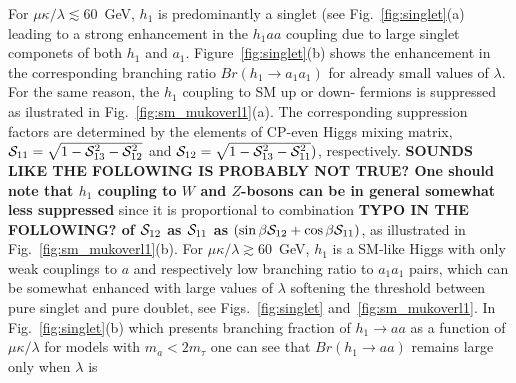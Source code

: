 \documentclass[aps,prl,twocolumn,nofootinbib,superscriptaddress]{revtex4}
\def\SC{{\cal S}}
\begin{document}
For $\mu\kappa/\lambda \lesssim 60$~GeV, $h_1$ is predominantly a singlet 
(see Fig.~\ref{fig:singlet}(a) leading to a strong enhancement in the $h_1 aa$ coupling due 
to large singlet componets of both $h_1$ and $a_1$. Figure~\ref{fig:singlet}(b) shows the
enhancement in the corresponding branching ratio $Br(h_1\to a_1 a_1)$ for already 
small values of $\lambda$. For the same reason, the $h_1$ coupling to SM up or down- fermions 
is suppressed as ilustrated in Fig.~\ref{fig:sm_mukoverl1}(a). The corresponding suppression 
factors are determined by the elements of CP-even Higgs mixing matrix, 
$\SC_{11} = \sqrt{1-\SC_{13}^2-\SC_{12}^2}$ and $\SC_{12} = \sqrt{1-\SC_{13}^2-\SC_{11}^2})$, 
respectively. {\bf SOUNDS LIKE THE FOLLOWING IS PROBABLY NOT TRUE? One should note that $h_1$ coupling to 
$W$ and $Z$-bosons can be in general somewhat less suppressed} since it is proportional to combination 
{\bf TYPO IN THE FOLLOWING? of $\SC_{12}$ as $\SC_{11}$ as $(\sin\beta \SC_{12}+\cos\beta \SC_{11})$}, as 
illustrated in Fig.~\ref{fig:sm_mukoverl1}(b).
For $\mu\kappa/\lambda \gtrsim 60$~GeV, $h_1$ is a SM-like Higgs with only weak couplings to 
$a$ and respectively low branching ratio to $a_1a_1$ pairs, which can be somewhat enhanced
with large values of $\lambda$  softening the threshold between pure singlet and pure doublet,
see  Figs.~\ref{fig:singlet} and~\ref{fig:sm_mukoverl1}. In Fig.~\ref{fig:singlet}(b) which 
presents branching fraction of $h_1 \to aa$  as a function of $\mu\kappa/\lambda$ for models
with $m_a < 2m_\tau$ one can see that $Br(h_1 \to aa)$ remains large only when $\lambda$ is 
\end{document}
